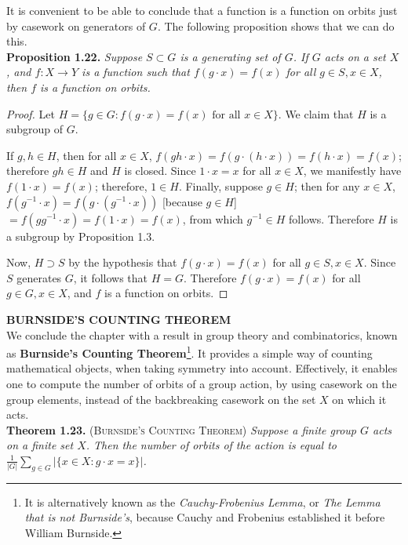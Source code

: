 \documentclass[leqno]{book}
\begin{document}
\noindent It is convenient to be able to conclude that a function is a function on orbits just by casework on generators of $G$.  The following proposition shows that we can do this.\\

\noindent\textbf{Proposition 1.22.} \emph{Suppose $S\subset G$ is a generating set of $G$.  If $G$ acts on a set $X$, and $f:X\to Y$ is a function such that $f(g\cdot x)=f(x)$ for all $g\in S,x\in X$, then $f$ is a function on orbits.}

\begin{proof}
Let $H=\{g\in G:f(g\cdot x)=f(x)\text{ for all }x\in X\}$.  We claim that $H$ is a subgroup of $G$.

If $g,h\in H$, then for all $x\in X$, $f(gh\cdot x)=f(g\cdot(h\cdot x))=f(h\cdot x)=f(x)$; therefore $gh\in H$ and $H$ is closed.  Since $1\cdot x=x$ for all $x\in X$, we manifestly have $f(1\cdot x)=f(x)$; therefore, $1\in H$.  Finally, suppose $g\in H$; then for any $x\in X$, $f(g^{-1}\cdot x)=f(g\cdot(g^{-1}\cdot x))$ [because $g\in H$] $=f(gg^{-1}\cdot x)=f(1\cdot x)=f(x)$, from which $g^{-1}\in H$ follows.  Therefore $H$ is a subgroup by Proposition 1.3.

Now, $H\supset S$ by the hypothesis that $f(g\cdot x)=f(x)$ for all $g\in S,x\in X$.  Since $S$ generates $G$, it follows that $H=G$.  Therefore $f(g\cdot x)=f(x)$ for all $g\in G,x\in X$, and $f$ is a function on orbits.
\end{proof}

\noindent\textbf{BURNSIDE'S COUNTING THEOREM}\\

\noindent We conclude the chapter with a result in group theory and combinatorics, known as \textbf{Burnside's Counting Theorem}\footnote{It is alternatively known as the \emph{Cauchy-Frobenius Lemma}, or \emph{The Lemma that is not Burnside's}, because Cauchy and Frobenius established it before William Burnside.}.  It provides a simple way of counting mathematical objects, when taking symmetry into account.  Effectively, it enables one to compute the number of orbits of a group action, by using casework on the group elements, instead of the backbreaking casework on the set $X$ on which it acts.\\

\noindent\textbf{Theorem 1.23.} (\textsc{Burnside's Counting Theorem}) \emph{Suppose a finite group $G$ acts on a finite set $X$.  Then the number of orbits of the action is equal to $\frac 1{|G|}\sum_{g\in G}|\{x\in X:g\cdot x=x\}|$.}\\
\end{document}
